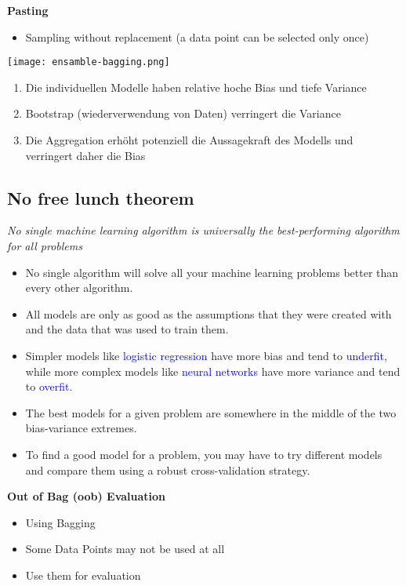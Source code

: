 \textbf{Pasting}
\begin{itemize}
    \item Sampling without replacement (a data point can be selected only once)
\end{itemize}
\vspace{10pt}
\texttt{[image: ensamble-bagging.png]}

\begin{enumerate}
    \item Die individuellen Modelle haben relative hoche Bias und tiefe Variance
    \item Bootstrap (wiederverwendung von Daten) verringert die Variance
    \item Die Aggregation erhöht potenziell die Aussagekraft des Modells und verringert daher die Bias
\end{enumerate}

\subsection{No free lunch theorem}
\textit{No single machine learning algorithm is universally the best-performing algorithm for all problems}

\begin{itemize}
    \item No single algorithm will solve all your machine learning problems better than every other algorithm.
    \item All models are only as good as the assumptions that they were created with and the data that was used to train them.
    \item Simpler models like \textcolor{blue}{logistic regression} have more bias and tend to \textcolor{blue}{underfit}, while more complex models like \textcolor{blue}{neural networks} have more variance and tend to \textcolor{blue}{overfit}.
    \item The best models for a given problem are somewhere in the middle of the two bias-variance extremes.
    \item To find a good model for a problem, you may have to try different models and compare them using a robust cross-validation strategy.
\end{itemize}
\vspace{10pt}
\textbf{Out of Bag (oob) Evaluation}
\begin{itemize}
    \item Using Bagging
    \item Some Data Points may not be used at all
    \item Use them for evaluation
\end{itemize}
